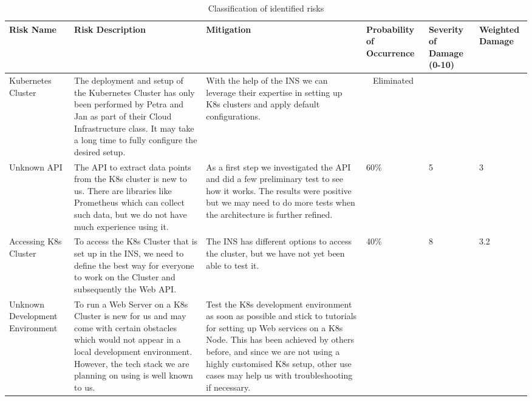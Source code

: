 \label{tab:risk-classification}
\begin{longtable}[h]{p{2.2cm} | p{4cm} | p{4cm} | p{1.5cm} | p{1.5cm} | p{1.5cm}}
    \caption{Classification of identified risks} \\
    \textbf{Risk Name} & \textbf{Risk Description} & \textbf{Mitigation} & \textbf{Probability of Occurrence} & \textbf{Severity of Damage (0-10)} & \textbf{Weighted Damage} \\ \hline
    \endhead
        Kubernetes Cluster
            & The deployment and setup of the Kubernetes Cluster has only been performed by Petra and Jan as part of their Cloud Infrastructure class. It may take a long time to fully configure the desired setup.
            & With the help of the INS we can leverage their expertise in setting up K8s clusters and apply default configurations.
            & \multicolumn{1}{c}{Eliminated} \\ \hline
        Unknown API 
            & The API to extract data points from the K8s cluster is new to us. There are libraries like Prometheus which can collect such data, but we do not have much experience using it.
            & As a first step we investigated the API and did a few preliminary test to see how it works. The results were positive but we may need to do more tests when the architecture is further refined.
            & 60\% & 5 & 3 \\ \hline
        Accessing K8s Cluster 
            & To access the K8s Cluster that is set up in the INS, we need to define the best way for everyone to work on the Cluster and subsequently the Web API.
            & The INS has different options to access the cluster, but we have not yet been able to test it.
            & 40\% & 8 & 3.2 \\ \hline
        Unknown Development Environment
            & To run a Web Server on a K8s Cluster is new for us and may come with certain obstacles which would not appear in a local development environment. However, the tech stack we are planning on using is well known to us.
            & Test the K8s development environment as soon as possible and stick to tutorials for setting up Web services on a K8s Node. This has been achieved by others before, and since we are not using a highly customised K8s setup, other use cases may help us with troubleshooting if necessary.

\end{longtable}
